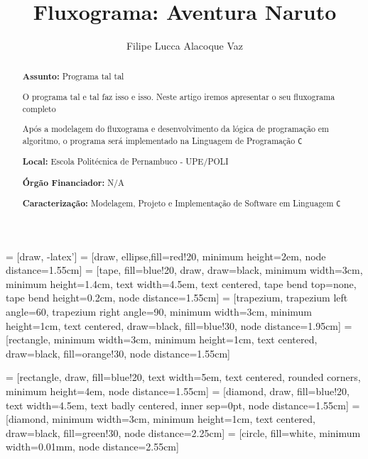 \documentclass[a4paper,12pt]{article} %
\title{Fluxograma: Aventura Naruto}
\author{Filipe Lucca Alacoque Vaz}
\begin{document}
\maketitle


 = [draw, -latex']
 = [draw, ellipse,fill=red!20, minimum height=2em, node distance=1.55cm]
 = [tape, fill=blue!20, draw, draw=black, minimum width=3cm, minimum height=1.4cm, text width=4.5em, text centered, tape bend top=none, tape bend height=0.2cm, node distance=1.55cm]
 = [trapezium, trapezium left angle=60, trapezium right angle=90, minimum width=3cm, minimum height=1cm, text centered, draw=black, fill=blue!30, node distance=1.95cm]
 = [rectangle, minimum width=3cm, minimum height=1cm, text centered, draw=black, fill=orange!30, node distance=1.55cm]

 = [rectangle, draw, fill=blue!20, text width=5em, text centered, rounded corners, minimum height=4em, node distance=1.55cm]
 = [diamond, draw, fill=blue!20, text width=4.5em, text badly centered, inner sep=0pt, node distance=1.55cm]
 = [diamond, minimum width=3cm, minimum height=1cm, text centered, draw=black, fill=green!30, node distance=2.25cm]
 = [circle, fill=white, minimum width=0.01mm, node distance=2.55cm]


\begin{abstract}

\textbf{Assunto:} Programa tal tal


O programa tal e tal faz isso e isso. Neste artigo iremos apresentar o seu fluxograma completo

Após a modelagem do fluxograma e desenvolvimento da lógica de programação em algoritmo,
o programa será implementado na Linguagem de Programação \texttt{C}


\textbf{Local:} Escola Politécnica de Pernambuco - UPE/POLI

\textbf{Órgão Financiador:} N/A

\textbf{Caracterização:} Modelagem, Projeto e Implementação de Software em Linguagem \texttt{C}


\end{abstract}
\end{document}
